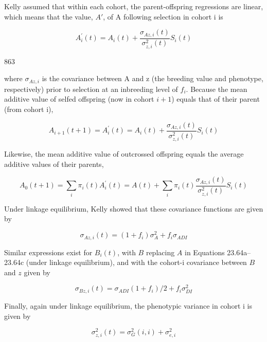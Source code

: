 \documentclass{article}
\begin{document}
Kelly assumed that within each cohort, the parent-offspring regressions are linear, which means that the value,  $ A' $, of A following selection in cohort i is

\begin{equation}
A_{i}^{\prime}(t)=A_{i}(t)+\frac{\sigma_{A z,i}(t)}{\sigma_{z,i}^{2}(t)}S_{i}(t)
\tag{23.64a}
\label{eq:23_64a}
\end{equation}

863

where  $ \sigma_{Az,i} $ is the covariance between A and z (the breeding value and phenotype, respectively) prior to selection at an inbreeding level of  $ f_i $. Because the mean additive value of selfed offspring (now in cohort  $ i+1 $) equals that of their parent (from cohort i),

\begin{equation}
A_{i+1}(t+1)=A_{i}^{\prime}(t)=A_{i}(t)+\frac{\sigma_{A z,i}(t)}{\sigma_{z,i}^{2}(t)}S_{i}(t)
\tag{23.64b}
\label{eq:23_64b}
\end{equation}

Likewise, the mean additive value of outcrossed offspring equals the average additive values of their parents,

\begin{equation}
A_{0}(t+1)=\sum_{i}\pi_{i}(t)A_{i}^{\prime}(t)=A(t)+\sum_{i}\pi_{i}(t)\frac{\sigma_{A z,i}(t)}{\sigma_{z,i}^{2}(t)}S_{i}(t)
\tag{23.64c}
\label{eq:23_64c}
\end{equation}

Under linkage equilibrium, Kelly showed that these covariance functions are given by

\begin{equation}
\sigma_{A z,i}(t)=(1+f_{i})\sigma_{A}^{2}+f_{i}\sigma_{A D I}
\tag{23.65a}
\label{eq:23_65a}
\end{equation}

Similar expressions exist for  $ B_i(t) $, with  $ B $ replacing  $ A $ in Equations 23.64a–23.64c (under linkage equilibrium), and with the cohort-i covariance between  $ B $ and  $ z $ given by

\begin{equation}
\sigma_{Bz,i}(t)=\sigma_{ADI}(1+f_{i})/2+f_{i}\sigma_{DI}^{2}
\tag{23.65b}
\label{eq:23_65b}
\end{equation}

Finally, again under linkage equilibrium, the phenotypic variance in cohort i is given by

\begin{equation}
\sigma_{z,i}^{2}(t)=\sigma_{G}^{2}(i,i)+\sigma_{e,i}^{2}
\tag{23.65c}
\label{eq:23_65c}
\end{equation}
\end{document}
